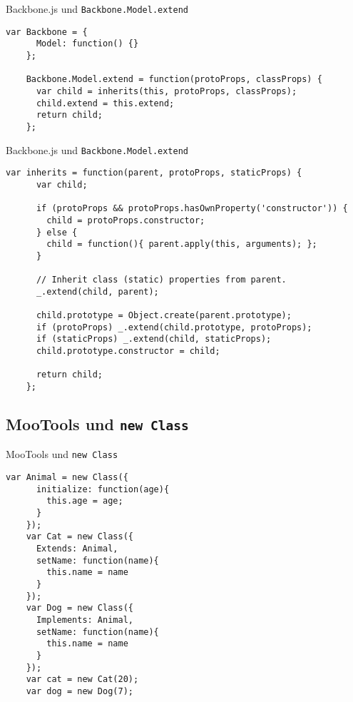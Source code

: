 \begin{frame}[fragile]{Backbone.js und \texttt{Backbone.Model.extend}}
  \begin{lstlisting}[gobble=4]
    var Backbone = {
      Model: function() {}
    };
    
    Backbone.Model.extend = function(protoProps, classProps) {
      var child = inherits(this, protoProps, classProps);
      child.extend = this.extend;
      return child;
    };
  \end{lstlisting}
\end{frame}

\begin{frame}[fragile]{Backbone.js und \texttt{Backbone.Model.extend}}
  \begin{lstlisting}[gobble=4]
    var inherits = function(parent, protoProps, staticProps) {
      var child;
    
      if (protoProps && protoProps.hasOwnProperty('constructor')) {
        child = protoProps.constructor;
      } else {
        child = function(){ parent.apply(this, arguments); };
      }
    
      // Inherit class (static) properties from parent.
      _.extend(child, parent);
    
      child.prototype = Object.create(parent.prototype);
      if (protoProps) _.extend(child.prototype, protoProps);
      if (staticProps) _.extend(child, staticProps);
      child.prototype.constructor = child;
    
      return child;
    };
  \end{lstlisting}
\end{frame}

\subsection{MooTools und \texttt{new Class}}

\begin{frame}[fragile]{MooTools und \texttt{new Class}}
  \begin{lstlisting}[gobble=4]
    var Animal = new Class({
      initialize: function(age){
        this.age = age;
      }
    });
    var Cat = new Class({
      Extends: Animal,
      setName: function(name){
        this.name = name
      }
    });
    var Dog = new Class({
      Implements: Animal,
      setName: function(name){
        this.name = name
      }
    });
    var cat = new Cat(20);
    var dog = new Dog(7);
  \end{lstlisting}
\end{frame}

